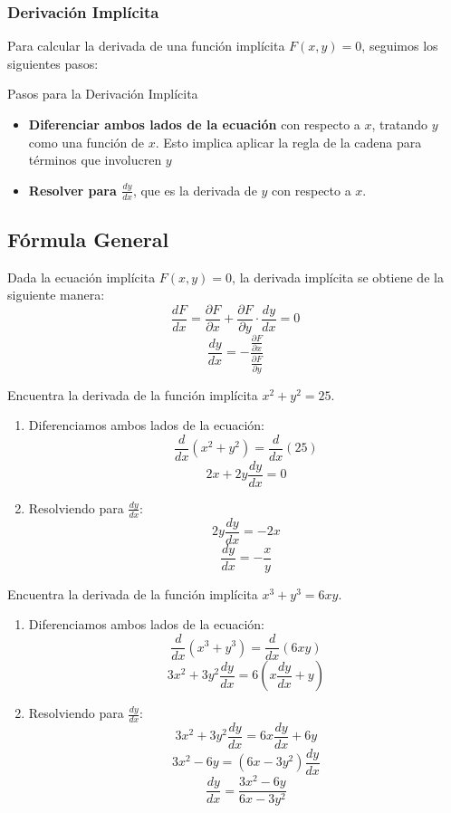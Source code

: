 \subsubsection{Derivación Implícita}
Para calcular la derivada de una función implícita \( F(x, y) = 0 \), seguimos los siguientes pasos:

Pasos para la Derivación Implícita
\begin{itemize}
    \item \textbf{Diferenciar ambos lados de la ecuación} con respecto a \( x \), tratando \( y \) como una función de \( x \). Esto implica aplicar la regla de la cadena para términos que involucren \( y \)
    \item \textbf{Resolver para \( \frac{dy}{dx} \)}, que es la derivada de \( y \) con respecto a \( x \).
\end{itemize}

\subsection*{Fórmula General}
Dada la ecuación implícita \( F(x, y) = 0 \), la derivada implícita se obtiene de la siguiente manera:
\[
\frac{dF}{dx} = \frac{\partial F}{\partial x} + \frac{\partial F}{\partial y} \cdot \frac{dy}{dx} = 0
\]
\[
\frac{dy}{dx} = -\frac{\frac{\partial F}{\partial x}}{\frac{\partial F}{\partial y}}
\]

\begin{example}
Encuentra la derivada de la función implícita \( x^2 + y^2 = 25 \).

\begin{enumerate}
    \item Diferenciamos ambos lados de la ecuación:
    \[
    \frac{d}{dx}(x^2 + y^2) = \frac{d}{dx}(25)
    \]
    \[
    2x + 2y \frac{dy}{dx} = 0
    \]
    
    \item  Resolviendo para \( \frac{dy}{dx} \):
    \[
    2y \frac{dy}{dx} = -2x
    \]
    \[
    \frac{dy}{dx} = -\frac{x}{y}
    \]
\end{enumerate}
\end{example}

\begin{example}
Encuentra la derivada de la función implícita \( x^3 + y^3 = 6xy \).

\begin{enumerate}
    \item Diferenciamos ambos lados de la ecuación:
    \[
    \frac{d}{dx}(x^3 + y^3) = \frac{d}{dx}(6xy)
    \]
    \[
    3x^2 + 3y^2 \frac{dy}{dx} = 6 \left( x \frac{dy}{dx} + y \right)
    \]
    
    \item  Resolviendo para \( \frac{dy}{dx} \):
    \[
    3x^2 + 3y^2 \frac{dy}{dx} = 6x \frac{dy}{dx} + 6y
    \]
    \[
    3x^2 - 6y = (6x - 3y^2) \frac{dy}{dx}
    \]
    \[
    \frac{dy}{dx} = \frac{3x^2 - 6y}{6x - 3y^2}
    \]
\end{enumerate}
\end{example}


